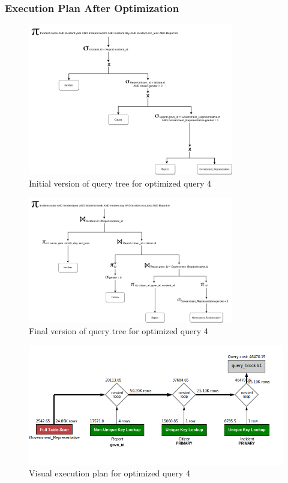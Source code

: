 \subsubsection{Execution Plan After Optimization}
\begin{figure}[H]
    \centering
    \includegraphics[width=0.8\textwidth]{images/query_trees/query4-optimized-initial-version.png}
    \caption{Initial version of query tree for optimized query 4}
\end{figure}
\begin{figure}[H]
    \centering
    \includegraphics[width=0.8\textwidth]{images/query_trees/query4-optimized-final-version.png}
    \caption{Final version of query tree for optimized query 4}
\end{figure}
\begin{figure}[H]
    \centering
    \includegraphics[width=\textwidth]{images/execution_plans/q4-2-new.png}
    \caption{Visual execution plan for optimized query 4}
\end{figure}

